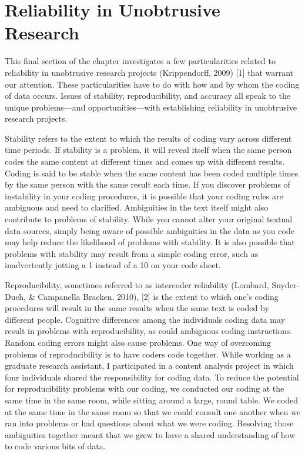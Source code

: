\section{Reliability in Unobtrusive Research}


This final section of the chapter investigates a few particularities related to reliability in unobtrusive research projects (Krippendorff, 2009) [1] that warrant our attention. These particularities have to do with how and by whom the coding of data occurs. Issues of stability, reproducibility, and accuracy all speak to the unique problems—and opportunities—with establishing reliability in unobtrusive research projects.

Stability refers to the extent to which the results of coding vary across different time periods. If stability is a problem, it will reveal itself when the same person codes the same content at different times and comes up with different results. Coding is said to be stable when the same content has been coded multiple times by the same person with the same result each time. If you discover problems of instability in your coding procedures, it is possible that your coding rules are ambiguous and need to clarified. Ambiguities in the text itself might also contribute to problems of stability. While you cannot alter your original textual data sources, simply being aware of possible ambiguities in the data as you code may help reduce the likelihood of problems with stability. It is also possible that problems with stability may result from a simple coding error, such as inadvertently jotting a 1 instead of a 10 on your code sheet.

Reproducibility, sometimes referred to as intercoder reliability (Lombard, Snyder-Duch, \& Campanella Bracken, 2010), [2] is the extent to which one’s coding procedures will result in the same results when the same text is coded by different people. Cognitive differences among the individuals coding data may result in problems with reproducibility, as could ambiguous coding instructions. Random coding errors might also cause problems. One way of overcoming problems of reproducibility is to have coders code together. While working as a graduate research assistant, I participated in a content analysis project in which four individuals shared the responsibility for coding data. To reduce the potential for reproducibility problems with our coding, we conducted our coding at the same time in the same room, while sitting around a large, round table. We coded at the same time in the same room so that we could consult one another when we ran into problems or had questions about what we were coding. Resolving those ambiguities together meant that we grew to have a shared understanding of how to code various bits of data.

